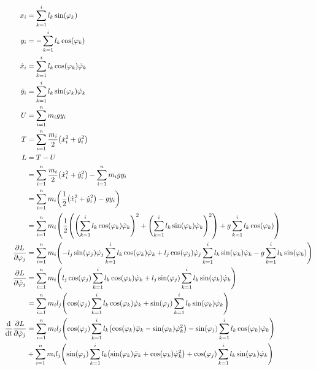 \documentclass{article}
\renewcommand{\phi}{\varphi}
\begin{document}
\begin{align*}
  x_i &= \sum_{k=1}^i l_k \sin(\phi_k) \\
  y_i &= - \sum_{k=1}^i l_k \cos(\phi_k) \\
  \dot x_i &= \sum_{k=1}^i l_k \cos(\phi_k) \dot\phi_k \\
  \dot y_i &= \sum_{k=1}^i l_k \sin(\phi_k) \dot\phi_k \\
  U &= \sum_{i=1}^n m_i g y_i \\
  T &= \sum_{i=1}^n \frac{m_i}{2} \pqty{\dot x_i^2 + \dot y_i^2} \\
  L &= T - U \\
    &= \sum_{i=1}^n \frac{m_i}{2} \pqty{\dot x_i^2 + \dot y_i^2} - \sum_{i=1}^n m_i g y_i \\
    &= \sum_{i=1}^n m_i \pqty{\frac{1}{2} \pqty{\dot x_i^2 + \dot y_i^2} - g y_i} \\
    &= \sum_{i=1}^n m_i \pqty{\frac{1}{2} \pqty{{\pqty{\sum_{k=1}^i l_k \cos(\phi_k) \dot\phi_k}}^2 + {\pqty{\sum_{k=1}^i l_k \sin(\phi_k) \dot\phi_k}}^2} + g \sum_{k=1}^i l_k \cos(\phi_k)} \\
  \pdv{L}{\phi_j} &= \sum_{i=1}^n m_i \pqty{-l_j \sin(\phi_j) \dot\phi_j \sum_{k=1}^i l_k \cos(\phi_k) \dot\phi_k + l_j \cos(\phi_j) \dot\phi_j \sum_{k=1}^i l_k \sin(\phi_k) \dot\phi_k - g \sum_{k=1}^i l_k \sin(\phi_k)} \\
  \pdv{L}{\dot\phi_j} &= \sum_{i=1}^n m_i \pqty{l_j \cos(\phi_j) \sum_{k=1}^i l_k \cos(\phi_k) \dot\phi_k + l_j \sin(\phi_j) \sum_{k=1}^i l_k \sin(\phi_k) \dot\phi_k} \\
                      &= \sum_{i=1}^n m_i l_j \pqty{\cos(\phi_j) \sum_{k=1}^i l_k \cos(\phi_k) \dot\phi_k + \sin(\phi_j) \sum_{k=1}^i l_k \sin(\phi_k) \dot\phi_k} \\
  \dv{t} \pdv{L}{\dot\phi_j} &= \sum_{i=1}^n m_i l_j \pqty{\cos(\phi_j) \sum_{k=1}^i l_k \pqty{\cos(\phi_k) \ddot\phi_k - \sin(\phi_k) \dot\phi_k^2} - \sin(\phi_j) \sum_{k=1}^i l_k \cos(\phi_k) \dot\phi_k} \\
                             &+ \sum_{i=1}^n m_i l_j \pqty{\sin(\phi_j) \sum_{k=1}^i l_k \pqty{\sin(\phi_k) \ddot\phi_k + \cos(\phi_k) \dot\phi_k^2} + \cos(\phi_j) \sum_{k=1}^i l_k \sin(\phi_k) \dot\phi_k} \\
\end{align*}
\end{document}
